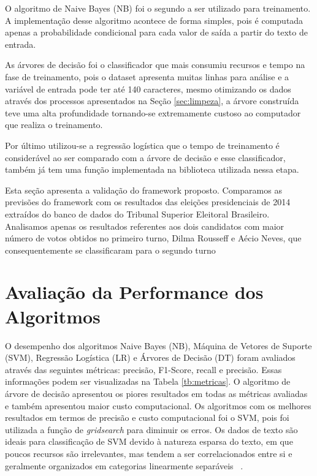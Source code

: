 O algoritmo de Naive Bayes (NB) foi o segundo a ser utilizado para treinamento. A implementação desse algoritmo acontece de forma simples, pois é 
computada apenas a probabilidade condicional para cada valor de saída a partir do texto de entrada.


 As árvores de decisão foi o classificador que mais consumiu recursos e tempo na fase de treinamento, pois o dataset apresenta muitas linhas para análise
 e a variável de entrada pode ter até 140 caracteres, mesmo otimizando os dados através dos processos apresentados na Seção \ref{sec:limpeza}, 
 a árvore construída teve uma alta profundidade tornando-se extremamente custoso ao computador que realiza o treinamento.
 
 Por último utilizou-se a regressão logística que o tempo de treinamento é considerável ao ser comparado com a árvore de decisão e esse classificador,
 também já tem uma função implementada na biblioteca utilizada nessa etapa.


 Esta seção apresenta a validação do framework proposto.
 Comparamos as previsões do framework com os resultados das
 eleições presidenciais de 2014 extraídos do banco de dados do
 Tribunal Superior Eleitoral Brasileiro. Analisamos apenas os
 resultados referentes aos dois candidatos com maior número
 de votos obtidos no primeiro turno, Dilma Rousseff e Aécio
 Neves, que consequentemente se classificaram para o segundo
 turno
 
 \section{Avaliação da Performance dos Algoritmos}
 
 O desempenho dos algoritmos Naive Bayes (NB), Máquina de
 Vetores de Suporte (SVM), Regressão Logística (LR) e Árvores de Decisão (DT)
 foram avaliados através das seguintes métricas: precisão, F1-Score,
 recall e precisão. Essas informações podem ser visualizadas
 na Tabela \ref{tb:metricas}.
 O algoritmo de árvore de decisão apresentou os piores resultados em todas
 as métricas avaliadas e também apresentou maior custo
 computacional. Os algoritmos com os melhores resultados
 em termos de precisão e custo computacional foi o \acrshort{SVM}, pois foi utilizada a função de \textit{gridsearch} para
 diminuir os erros.
 Os dados de texto são ideais para classificação de SVM
 devido à natureza esparsa do texto, em que poucos recursos
 são irrelevantes, mas tendem a ser correlacionados entre si e
 geralmente organizados em categorias linearmente separáveis
 ~\cite{medhat}.
 
